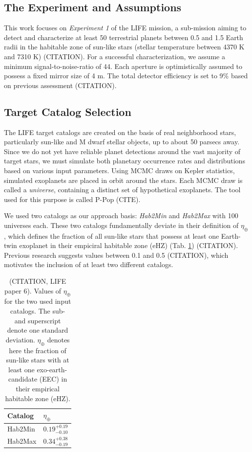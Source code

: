 \documentclass[12pt,a4paper]{article}
\numberwithin{equation}{section}
\numberwithin{figure}{section}
\numberwithin{table}{section}
\begin{document}
\newpage

\subsection{The Experiment and Assumptions}
This work focuses on \textit{Experiment 1} of the LIFE mission, a sub-mission aiming to detect and characterize at least 50 terrestrial planets between 0.5 and 1.5 Earth radii in the habitable zone of sun-like stars (stellar temperature between 4370 K and 7310 K) (CITATION). For a successful characterization, we assume a minimum signal-to-noise-ratio of 44. Each aperture is optimistically assumed to possess a fixed mirror size of 4 m. The total detector efficiency is set to 9\% based on previous assessment (CITATION).

\subsection{Target Catalog Selection} \label{sec: intro: catalog}
The LIFE target catalogs are created on the basis of real neighborhood stars, particularly sun-like and M dwarf stellar objects, up to about 50 parsecs away. Since we do not yet have reliable planet detections around the vast majority of target stars, we must simulate both planetary occurrence rates and distributions based on various input parameters. Using MCMC draws on Kepler statistics, simulated exoplanets are placed in orbit around the stars. Each MCMC draw is called a \textit{universe}, containing a distinct set of hypothetical exoplanets. The tool used for this purpose is called P-Pop (CITE).

We used two catalogs as our approach basis: \textit{Hab2Min} and \textit{Hab2Max} with 100 universes each. These two catalogs fundamentally deviate in their definition of $\eta_{\oplus}$, which defines the fraction of all sun-like stars that possess at least one Earth-twin exoplanet in their empiciral habitable zone (eHZ) (Tab. \ref{tab: eta earth}) (CITATION). Previous research suggests values between 0.1 and 0.5 (CITATION), which motivates the inclusion of at least two different catalogs.

\begin{table}[htbp]
\centering
\begin{tabular}{@{}ll@{}}
\toprule
Catalog & $\eta_{\oplus}$ \\
\midrule
Hab2Min & $0.19_{-0.10}^{+0.19}$ \\
Hab2Max & $0.34_{-0.19}^{+0.38}$ \\
\bottomrule
\end{tabular}
\caption{(CITATION, LIFE paper 6). Values of $\eta_{\oplus}$ for the two used input catalogs. The sub- and superscript denote one standard deviation. $\eta_{\oplus}$ denotes here the fraction of sun-like stars with at least one exo-earth-candidate (EEC) in their empirical habitable zone (eHZ).}
\label{tab: eta earth}
\end{table}
\end{document}
